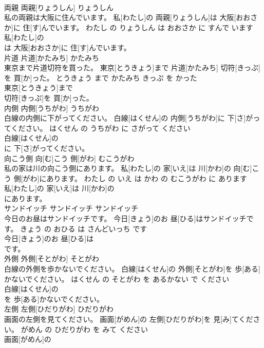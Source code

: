 \documentclass[8pt]{extreport}
\begin{document}
\begin{CJK}{UTF8}{min}
\\	両親	両親[りょうしん]	りょうしん	
\\	私の両親は大阪に住んでいます。	私[わたし]の 両親[りょうしん]は 大阪[おおさか]に 住[す]んでいます。	わたし の りょうしん は おおさか に すんで います	
\\	私[わたし]の
\\	は 大阪[おおさか]に 住[す]んでいます。			
\\	片道	片道[かたみち]	かたみち	
\\	東京まで片道切符を買った。	東京[とうきょう]まで 片道[かたみち] 切符[きっぷ]を 買[か]った。	とうきょう まで かたみち きっぷ を かった	
\\	東京[とうきょう]まで
\\	切符[きっぷ]を 買[か]った。			
\\	内側	内側[うちがわ]	うちがわ	
\\	白線の内側に下がってください。	白線[はくせん]の 内側[うちがわ]に 下[さ]がってください。	はくせん の うちがわ に さがって ください	
\\	白線[はくせん]の
\\	に 下[さ]がってください。			
\\	向こう側	向[む]こう 側[がわ]	むこうがわ	
\\	私の家は川の向こう側にあります。	私[わたし]の 家[いえ]は 川[かわ]の 向[む]こう 側[がわ]にあります。	わたし の いえ は かわ の むこうがわ に あります	
\\	私[わたし]の 家[いえ]は 川[かわ]の
\\	にあります。			
\\	サンドイッチ	サンドイッチ	サンドイッチ	
\\	今日のお昼はサンドイッチです。	今日[きょう]のお 昼[ひる]はサンドイッチです。	きょう の おひる は さんどいっち です	
\\	今日[きょう]のお 昼[ひる]は
\\	です。			
\\	外側	外側[そとがわ]	そとがわ	
\\	白線の外側を歩かないでください。	白線[はくせん]の 外側[そとがわ]を 歩[ある]かないでください。	はくせん の そとがわ を あるかない で ください	
\\	白線[はくせん]の
\\	を 歩[ある]かないでください。			
\\	左側	左側[ひだりがわ]	ひだりがわ	
\\	画面の左側を見てください。	画面[がめん]の 左側[ひだりがわ]を 見[み]てください。	がめん の ひだりがわ を みて ください	
\\	画面[がめん]の

\end{CJK}
\end{document}
